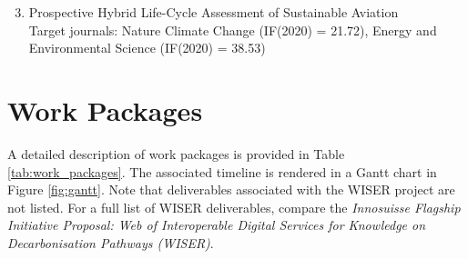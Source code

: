 \documentclass{article}
\begin{document}
    \begin{enumerate}
    \setcounter{enumi}{2}
        \item Prospective Hybrid Life-Cycle Assessment of Sustainable Aviation \\ Target journals: Nature Climate Change (IF(2020) = 21.72), Energy and Environmental Science (IF(2020) = 38.53)
    \end{enumerate}

    \newpage
    \section{Work Packages}
    
        A detailed description of work packages is provided in Table \ref{tab:work_packages}. The associated timeline is rendered in a Gantt chart in Figure \ref{fig:gantt}. Note that deliverables associated with the WISER project are not listed. For a full list of WISER deliverables, compare the \textit{Innosuisse Flagship Initiative Proposal: Web of Interoperable Digital Services for Knowledge on Decarbonisation Pathways (WISER)}.
    
\end{document}

